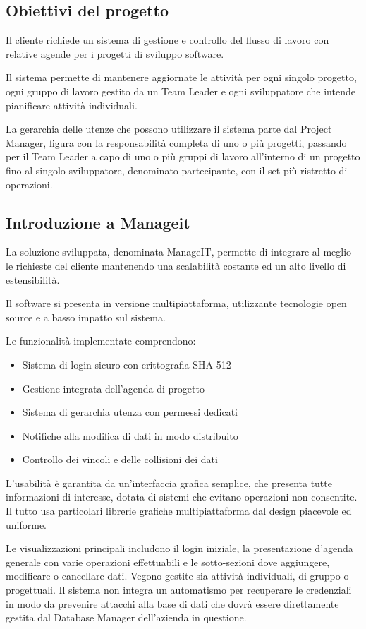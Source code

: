 \documentclass[12pt]{scrartcl}
\begin{document}
\subsection{Obiettivi del progetto}
Il cliente richiede un sistema di gestione e controllo del flusso
di lavoro con relative agende per i progetti di sviluppo software.

Il sistema permette di mantenere aggiornate le attivit\`a per ogni
singolo progetto, ogni gruppo di lavoro gestito da un Team Leader
e ogni sviluppatore che intende pianificare attivit\`a individuali.

La gerarchia delle utenze che possono utilizzare il sistema parte
dal Project Manager, figura con la responsabilit\`a completa di uno
o pi\`u progetti, passando per il Team Leader a capo di uno o pi\`u
gruppi di lavoro all'interno di un progetto fino al singolo
sviluppatore, denominato partecipante, con il set pi\`u ristretto
di operazioni.

\subsection{Introduzione a Manageit}
La soluzione sviluppata, denominata ManageIT, permette di integrare
al meglio le richieste del cliente mantenendo una scalabilit\`a costante
ed un alto livello di estensibilit\`a.

Il software si presenta in versione multipiattaforma, 
utilizzante tecnologie open source
e a basso impatto sul sistema.

Le funzionalit\`a implementate comprendono:
\begin{itemize}
\item Sistema di login sicuro con crittografia SHA-512
\item Gestione integrata dell'agenda di progetto
\item Sistema di gerarchia utenza con permessi dedicati
\item Notifiche alla modifica di dati in modo distribuito
\item Controllo dei vincoli e delle collisioni dei dati
\end{itemize}

L'usabilit\`a \`e garantita da un'interfaccia
grafica semplice, che presenta tutte informazioni di interesse, dotata di
sistemi che evitano operazioni non consentite. Il tutto usa particolari
librerie grafiche multipiattaforma dal design piacevole ed
uniforme.

Le visualizzazioni principali includono il login iniziale,
la presentazione d'agenda generale con varie operazioni
effettuabili e le sotto-sezioni dove aggiungere, modificare o
cancellare dati. Vegono gestite sia attivit\`a individuali, di gruppo o progettuali.
Il sistema non integra
un automatismo per recuperare le credenziali in modo da prevenire
attacchi alla base di dati che dovr\`a essere direttamente gestita
dal Database Manager dell'azienda in questione.
\end{document}
